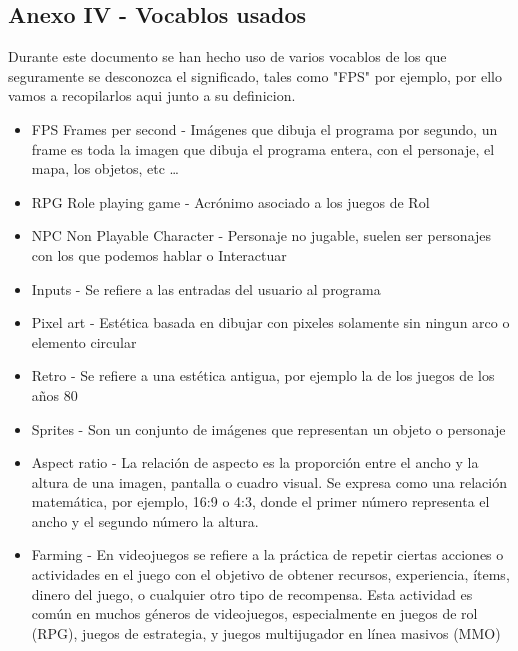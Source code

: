\documentclass[a4paper]{article}
\begin{document}
\begin{appendices}
    \section{Anexo IV - Vocablos usados}
    Durante este documento se han hecho uso de varios vocablos de los que seguramente se desconozca el significado, tales como "FPS" por ejemplo, por ello vamos a recopilarlos aqui junto a su definicion.
    \begin{itemize}
        \item FPS Frames per second - Imágenes que dibuja el programa por segundo, un frame es toda la imagen que dibuja el programa entera, con el personaje, el mapa, los objetos, etc \dots
        \item RPG Role playing game - Acrónimo asociado a los juegos de Rol
        \item NPC Non Playable Character - Personaje no jugable, suelen ser personajes con los que podemos hablar o Interactuar
        \item Inputs - Se refiere a las entradas del usuario al programa
        \item Pixel art - Estética basada en dibujar con pixeles solamente sin ningun arco o elemento circular
        \item Retro - Se refiere a una estética antigua, por ejemplo la de los juegos de los años 80
        \item Sprites - Son un conjunto de imágenes que representan un objeto o personaje
        \item Aspect ratio - La relación de aspecto es la proporción entre el ancho y la altura de una imagen, pantalla o cuadro visual. Se expresa como una relación matemática, por ejemplo, 16:9 o 4:3, donde el primer número representa el ancho y el segundo número la altura.
        \item Farming - En videojuegos se refiere a la práctica de repetir ciertas acciones o actividades en el juego con el objetivo de obtener recursos, experiencia, ítems, dinero del juego, o cualquier otro tipo de recompensa. Esta actividad es común en muchos géneros de videojuegos, especialmente en juegos de rol (RPG), juegos de estrategia, y juegos multijugador en línea masivos (MMO)
    \end{itemize}
    \clearpage

\end{appendices}
\end{document}
